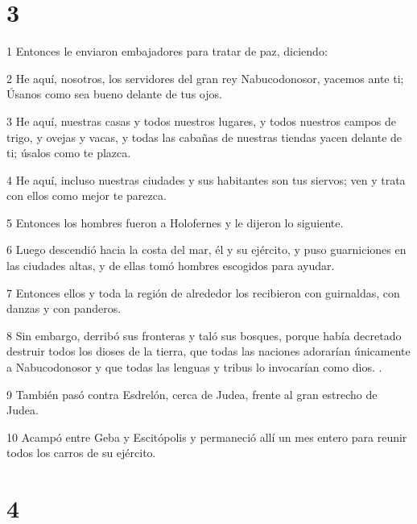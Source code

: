 \chapter{3}

\par 1 Entonces le enviaron embajadores para tratar de paz, diciendo:
\par 2 He aquí, nosotros, los servidores del gran rey Nabucodonosor, yacemos ante ti; Úsanos como sea bueno delante de tus ojos.
\par 3 He aquí, nuestras casas y todos nuestros lugares, y todos nuestros campos de trigo, y ovejas y vacas, y todas las cabañas de nuestras tiendas yacen delante de ti; úsalos como te plazca.
\par 4 He aquí, incluso nuestras ciudades y sus habitantes son tus siervos; ven y trata con ellos como mejor te parezca.
\par 5 Entonces los hombres fueron a Holofernes y le dijeron lo siguiente.
\par 6 Luego descendió hacia la costa del mar, él y su ejército, y puso guarniciones en las ciudades altas, y de ellas tomó hombres escogidos para ayudar.
\par 7 Entonces ellos y toda la región de alrededor los recibieron con guirnaldas, con danzas y con panderos.
\par 8 Sin embargo, derribó sus fronteras y taló sus bosques, porque había decretado destruir todos los dioses de la tierra, que todas las naciones adorarían únicamente a Nabucodonosor y que todas las lenguas y tribus lo invocarían como dios. .
\par 9 También pasó contra Esdrelón, cerca de Judea, frente al gran estrecho de Judea.
\par 10 Acampó entre Geba y Escitópolis y permaneció allí un mes entero para reunir todos los carros de su ejército.

\chapter{4}

